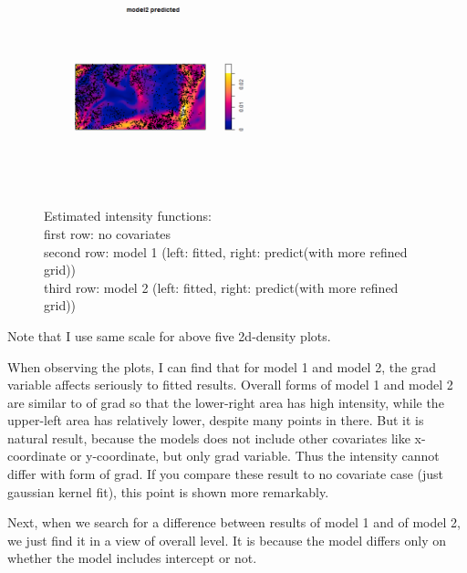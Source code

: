 \documentclass{article}
\begin{document}
\begin{figure}[h]
    \includegraphics[width=6cm]{prob3_model2_predict.png}
    \caption{Estimated intensity functions: \\
    first row: no covariates\\
    second row: model 1 (left: fitted, right: predict(with more refined grid)) \\
    third row: model 2 (left: fitted, right: predict(with more refined grid))
    }
\end{figure}

\clearpage
Note that I use same scale for above five 2d-density plots.

When observing the plots, I can find that for model 1 and model 2,
the grad variable affects seriously to fitted results. 
Overall forms of model 1 and model 2 are similar to of grad so that the lower-right area has high intensity,
while the upper-left area has relatively lower, despite many points in there.
But it is natural result, because the models does not include other covariates like x-coordinate or y-coordinate,
but only grad variable. Thus the intensity cannot differ with form of grad.
If you compare these result to no covariate case (just gaussian kernel fit), this point is shown more remarkably.

Next, when we search for a difference between results of model 1 and of model 2,
we just find it in a view of overall level. It is because the model differs only on whether the model includes intercept or not.
\end{document}

